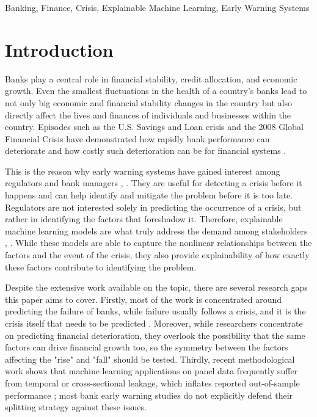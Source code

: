 \documentclass[conference]{IEEEtran}
\begin{document}
\begin{IEEEkeywords}
Banking, Finance, Crisis, Explainable Machine Learning, Early Warning Systems
\end{IEEEkeywords}

\section{Introduction}
Banks play a central role in financial stability, credit allocation, and economic growth. Even the smallest fluctuations in the health of a country's banks lead to not only big economic and financial stability changes in the country but also directly affect the lives and finances of individuals and businesses within the country. Episodes such as the U.S. Savings and Loan crisis and the 2008 Global Financial Crisis have demonstrated how rapidly bank performance can deteriorate and how costly such deterioration can be for financial systems \cite{b1}.

This is the reason why early warning systems have gained interest among regulators and bank managers \cite{b2}, \cite{b3}. They are useful for detecting a crisis before it happens and can help identify and mitigate the problem before it is too late. Regulators are not interested solely in predicting the occurrence of a crisis, but rather in identifying the factors that foreshadow it. Therefore, explainable machine learning models are what truly address the demand among stakeholders \cite{b3}, \cite{b4}. While these models are able to capture the nonlinear relationships between the factors and the event of the crisis, they also provide explainability of how exactly these factors contribute to identifying the problem.

Despite the extensive work available on the topic, there are several research gaps this paper aims to cover. Firstly, most of the work is concentrated around predicting the failure of banks, while failure usually follows a crisis, and it is the crisis itself that needs to be predicted \cite{b1}. Moreover, while researchers concentrate on predicting financial deterioration, they overlook the possibility that the same factors can drive financial growth too, so the symmetry between the factors affecting the "rise" and "fall" should be tested. Thirdly, recent methodological work shows that machine learning applications on panel data frequently suffer from temporal or cross-sectional leakage, which inflates reported out-of-sample performance \cite{b5}; most bank early warning studies do not explicitly defend their splitting strategy against these issues.
\end{document}
